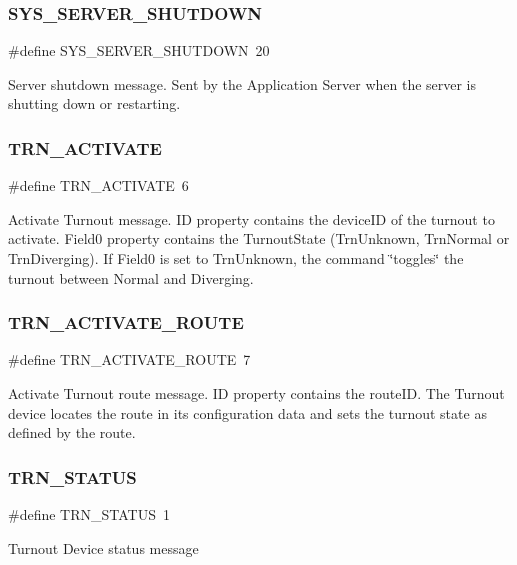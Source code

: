 \subsubsection{\texorpdfstring{S\+Y\+S\+\_\+\+S\+E\+R\+V\+E\+R\+\_\+\+S\+H\+U\+T\+D\+O\+WN}{SYS\_SERVER\_SHUTDOWN}}
{\footnotesize\ttfamily \#define S\+Y\+S\+\_\+\+S\+E\+R\+V\+E\+R\+\_\+\+S\+H\+U\+T\+D\+O\+WN~20}

Server shutdown message. Sent by the Application Server when the server is shutting down or restarting. \mbox{\label{group___u_d_p_message_i_d_gab5a0eacfbf0cfab134534d10890d5c25}} 
\subsubsection{\texorpdfstring{T\+R\+N\+\_\+\+A\+C\+T\+I\+V\+A\+TE}{TRN\_ACTIVATE}}
{\footnotesize\ttfamily \#define T\+R\+N\+\_\+\+A\+C\+T\+I\+V\+A\+TE~6}

Activate Turnout message. ID property contains the device\+ID of the turnout to activate. Field0 property contains the Turnout\+State (Trn\+Unknown, Trn\+Normal or Trn\+Diverging). If Field0 is set to Trn\+Unknown, the command \char`\"{}toggles\char`\"{} the turnout between Normal and Diverging. \mbox{\label{group___u_d_p_message_i_d_ga44d53121d88631ed14d77f8b6a405816}} 
\subsubsection{\texorpdfstring{T\+R\+N\+\_\+\+A\+C\+T\+I\+V\+A\+T\+E\+\_\+\+R\+O\+U\+TE}{TRN\_ACTIVATE\_ROUTE}}
{\footnotesize\ttfamily \#define T\+R\+N\+\_\+\+A\+C\+T\+I\+V\+A\+T\+E\+\_\+\+R\+O\+U\+TE~7}

Activate Turnout route message. ID property contains the route\+ID. The Turnout device locates the route in its configuration data and sets the turnout state as defined by the route. \mbox{\label{group___u_d_p_message_i_d_gacf1beacf20d9d977b8a27878039d43d7}} 
\subsubsection{\texorpdfstring{T\+R\+N\+\_\+\+S\+T\+A\+T\+US}{TRN\_STATUS}}
{\footnotesize\ttfamily \#define T\+R\+N\+\_\+\+S\+T\+A\+T\+US~1}

Turnout Device status message 